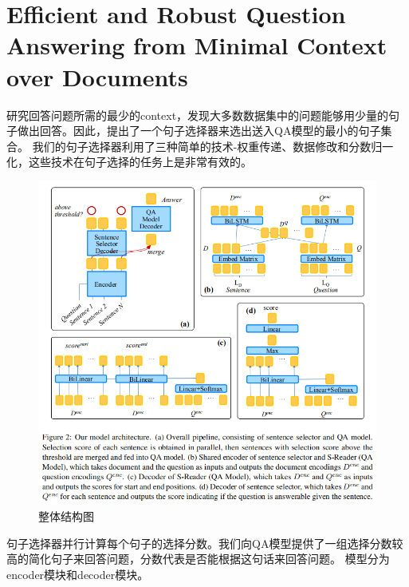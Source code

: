 \documentclass[a4paper,UTF8]{article}
\numberwithin{equation}{section}
\begin{document}
\section{Efficient and Robust Question Answering from Minimal Context over Documents}
研究回答问题所需的最少的context，发现大多数数据集中的问题能够用少量的句子做出回答。因此，提出了一个句子选择器来选出送入QA模型的最小的句子集合。
我们的句子选择器利用了三种简单的技术-权重传递、数据修改和分数归一化，这些技术在句子选择的任务上是非常有效的。\\
\begin{figure}[H]
	\centering
	\includegraphics[width=\textwidth]{7-1.png}
	\caption{整体结构图}
\end{figure}
句子选择器并行计算每个句子的选择分数。我们向QA模型提供了一组选择分数较高的简化句子来回答问题，分数代表是否能根据这句话来回答问题。
模型分为encoder模块和decoder模块。
\end{document}
